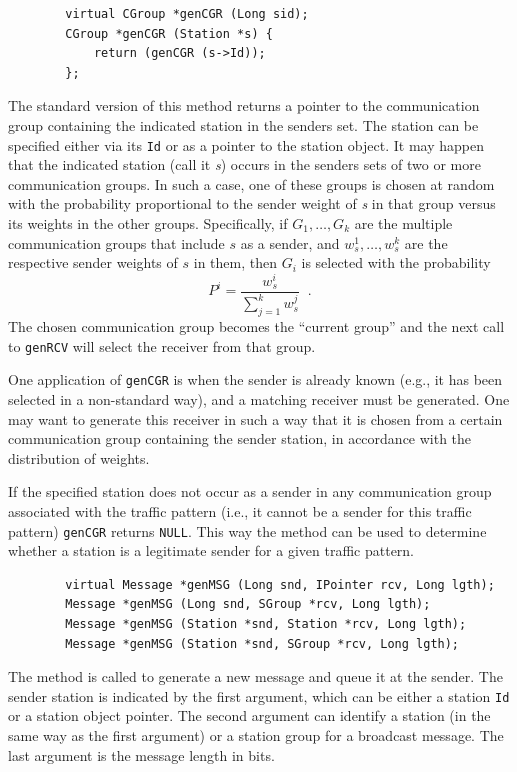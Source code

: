 \begin{verbatim}
        virtual CGroup *genCGR (Long sid);
        CGroup *genCGR (Station *s) {
            return (genCGR (s->Id));
        };
\end{verbatim}
\noindent
The standard version of this
method returns a pointer to the communication group containing the
indicated station in the senders set.
The station can be specified either via its {\tt Id} or as a pointer to the
station object.
It may happen that the indicated station (call it {\em s\/})
occurs in the senders sets of two or more communication
groups.
In such a case, one of these groups is chosen at random with the
probability proportional to the sender weight of {\em s\/} in that
group versus its weights in the other groups.
Specifically, if $G_1, \ldots , G_k$ are the multiple communication groups
that include $s$ as a sender, and $w_s^1, \ldots , w_s^k$ are the respective
sender weights of $s$ in them, then $G_i$ is selected with the probability
\[
P^i = \frac{w_s^i}{\sum_{j=1}^k w_s^j} \;\;.
\]
\noindent
The chosen communication group becomes the ``current group'' and the next
call to {\tt genRCV} will select the receiver from that group.

One application of {\tt genCGR} is when the sender is already known (e.g., it
has been selected in a non-standard way), and a matching receiver must be
generated.
One may want to generate this receiver
in such a way that it is chosen from a certain
communication group containing the sender station, in accordance with the
distribution of weights.

If the specified station does not occur as a sender in any communication
group associated with the traffic pattern (i.e., it
cannot be a sender for this traffic pattern)
{\tt genCGR} returns {\tt NULL}.
This way the method can be used to determine whether a station is a
legitimate sender for a given traffic pattern.

\begin{verbatim}
        virtual Message *genMSG (Long snd, IPointer rcv, Long lgth);
        Message *genMSG (Long snd, SGroup *rcv, Long lgth);
        Message *genMSG (Station *snd, Station *rcv, Long lgth);
        Message *genMSG (Station *snd, SGroup *rcv, Long lgth);
\end{verbatim}
\noindent
The method is called to generate a new message and queue it at
the sender.
The sender station is indicated by the first argument, which can be either
a station {\tt Id} or a station object pointer.
The second argument can identify a station (in the same way as the first
argument) or a station group for a broadcast message.
The last argument is the message length in bits.

